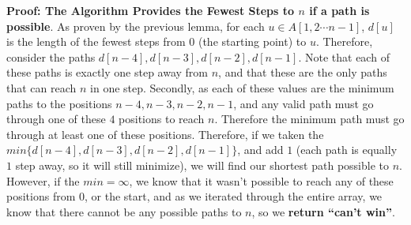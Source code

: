 \documentclass{article}
\begin{document}
\textbf{Proof: The Algorithm Provides the Fewest Steps to $n$ if a path is possible}. As proven by the previous lemma, for each $u \in A[1, 2 \cdots n-1 ]$, $d[u]$ is the length of the fewest steps from $0$ (the starting point) to $u$. Therefore, consider the paths $d[n-4],d[n-3],d[n-2],d[n-1]$. Note that each of these paths is exactly one step away from $n$, and that these are the only paths that can reach $n$ in one step. Secondly, as each of these values are the minimum paths to the positions $n-4,n-3,n-2,n-1$, and any valid path must go through one of these $4$ positions to reach $n$. Therefore the minimum path must go through at least one of these positions. Therefore, if we taken the $min\{d[n-4],d[n-3],d[n-2],d[n-1]\}$, and add $1$ (each path is equally $1$ step away, so it will still minimize), we will find our shortest path possible to $n$. However, if the $min= \infty$, we know that it wasn't possible to reach any of these positions from $0$, or the start, and as we iterated through the entire array, we know that there cannot be any possible paths to $n$, so we \textbf{return “can’t win”}. \newline
\end{document}
